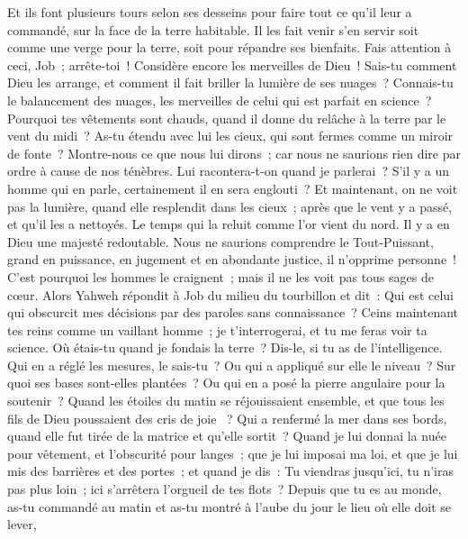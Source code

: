 \begin{multicols}{2}
Et ils font plusieurs tours selon ses desseins pour faire tout ce qu'il leur a commandé, sur la face de la terre habitable.
Il les fait venir s'en servir soit comme une verge pour la terre, soit pour répandre ses bienfaits.
Fais attention à ceci, Job~; arrête-toi~! Considère encore les merveilles de Dieu~!
Sais-tu comment Dieu les arrange, et comment il fait briller la lumière de ses nuages~?
Connais-tu le balancement des nuages, les merveilles de celui qui est parfait en science~?
Pourquoi tes vêtements sont chauds, quand il donne du relâche à la terre par le vent du midi~?
As-tu étendu avec lui les cieux, qui sont fermes comme un miroir de fonte~?
Montre-nous ce que nous lui dirons~; car nous ne saurions rien dire par ordre à cause de nos ténèbres.
Lui racontera-t-on quand je parlerai~? S'il y a un homme qui en parle, certainement il en sera englouti~?
Et maintenant, on ne voit pas la lumière, quand elle resplendit dans les cieux~; après que le vent y a passé, et qu'il les a nettoyés.
Le temps qui la reluit comme l'or vient du nord. Il y a en Dieu une majesté redoutable.
Nous ne saurions comprendre le Tout-Puissant, grand en puissance, en jugement et en abondante justice, il n'opprime personne~!
C'est pourquoi les hommes le craignent~; mais il ne les voit pas tous sages de cœur.
\VerseOne{}Alors Yahweh répondit à Job du milieu du tourbillon et dit~:
Qui est celui qui obscurcit mes décisions par des paroles sans connaissance~?
Ceins maintenant tes reins comme un vaillant homme~; je t'interrogerai, et tu me feras voir ta science.
Où étais-tu quand je fondais la terre~? Dis-le, si tu as de l'intelligence.
Qui en a réglé les mesures, le sais-tu~? Ou qui a appliqué sur elle le niveau~?
Sur quoi ses bases sont-elles plantées~? Ou qui en a posé la pierre angulaire pour la soutenir~?
Quand les étoiles du matin se réjouissaient ensemble, et que tous les fils de Dieu poussaient des cris de joie ~?
Qui a renfermé la mer dans ses bords, quand elle fut tirée de la matrice et qu'elle sortit~?
Quand je lui donnai la nuée pour vêtement, et l'obscurité pour langes~;
que je lui imposai ma loi, et que je lui mis des barrières et des portes~;
 et quand je dis~: Tu viendras jusqu'ici, tu n'iras pas plus loin~; ici s'arrêtera l'orgueil de tes flots~?
Depuis que tu es au monde, as-tu commandé au matin et as-tu montré à l'aube du jour le lieu où elle doit se lever,

\end{multicols}
